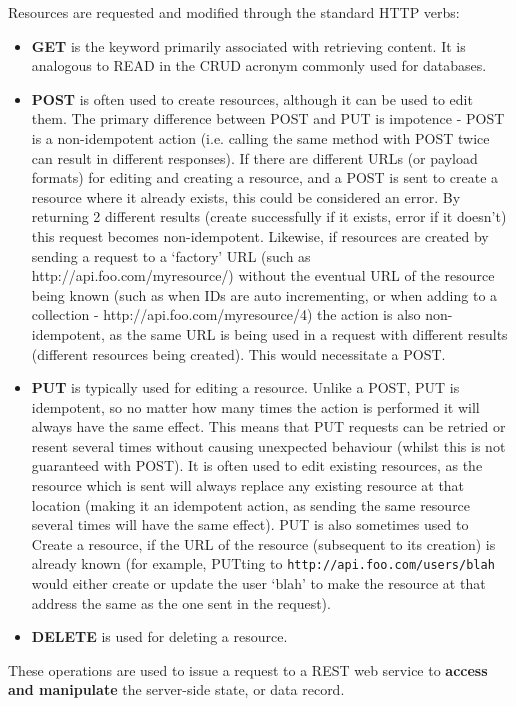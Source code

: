 \documentclass{article}
\begin{document}
Resources are requested and modified through the standard HTTP verbs:
\begin{itemize}
    \item \textbf{GET} is the keyword primarily associated with retrieving content. It is analogous to READ in the CRUD acronym commonly used for databases.
    \item \textbf{POST} is often used to create resources, although it can be used to edit them. The primary difference between POST and PUT is impotence - POST is a non-idempotent action (i.e. calling the same method with POST twice can result in different responses). If there are different URLs (or payload formats) for editing and creating a resource, and a POST is sent to create a resource where it already exists, this could be considered an error. By returning 2 different results (create successfully if it exists, error if it doesn't) this request becomes non-idempotent. Likewise, if resources are created by sending a request to a `factory' URL (such as http://api.foo.com/myresource/) without the eventual URL of the resource being known (such as when IDs are auto incrementing, or when adding to a collection - http://api.foo.com/myresource/4) the action is also non-idempotent, as the same URL is being used in a request with different results (different resources being created). This would necessitate a POST. 
    \item \textbf{PUT} is typically used for editing a resource. Unlike a POST, PUT is idempotent, so no matter how many times the action is performed it will always have the same effect. This means that PUT requests can be retried or resent several times without causing unexpected behaviour (whilst this is not guaranteed with POST). It is often used to edit existing resources, as the resource which is sent will always replace any existing resource at that location (making it an idempotent action, as sending the same resource several times will have the same effect). PUT is also sometimes used to Create a resource, if the URL of the resource (subsequent to its creation) is already known (for example, PUTting to \texttt{http://api.foo.com/users/blah} would either create or update the user `blah' to make the resource at that address the same as the one sent in the request).
    \item \textbf{DELETE} is used for deleting a resource.
\end{itemize}
These operations are used to issue a request to a REST web service to \textbf{access and manipulate} the server-side state, or data record.
\end{document}
